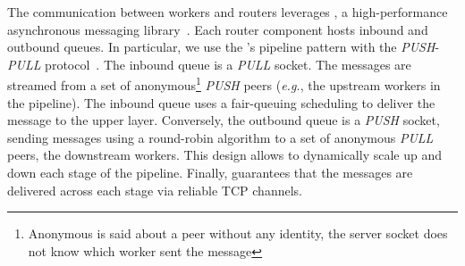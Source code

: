 The communication between workers and routers leverages \zmq, a high-performance asynchronous messaging library~\cite{zero_mq}.
Each router component hosts inbound and outbound queues. %
In particular, we use the \zmq's pipeline pattern with the \emph{PUSH}-\emph{PULL} protocol~\cite{zero_mq:pipeline}.
The inbound queue is a \emph{PULL} socket.
The messages are streamed from a set of anonymous\footnote{Anonymous is said about a peer without any identity, the server socket does not know which worker sent the message} \emph{PUSH} peers (\emph{e.g.}, the upstream workers in the pipeline).
The inbound queue uses a fair-queuing scheduling to deliver the message to the upper layer.
Conversely, the outbound queue is a \emph{PUSH} socket, sending messages using a round-robin algorithm to a set of anonymous \emph{PULL} peers, the downstream workers.
This design allows to dynamically scale up and down each stage of the pipeline. %
Finally, \zmq guarantees that the messages are delivered across each stage via reliable TCP channels.
